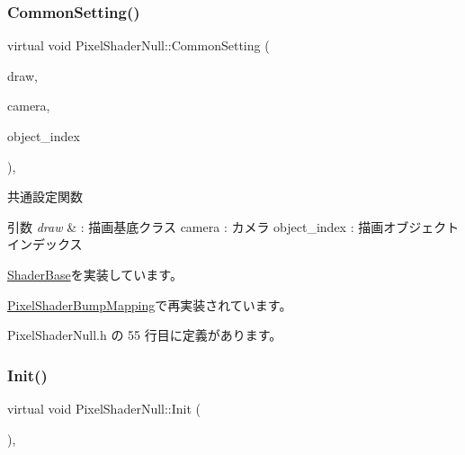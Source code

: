 \subsubsection{\texorpdfstring{Common\+Setting()}{CommonSetting()}}
{\footnotesize\ttfamily virtual void Pixel\+Shader\+Null\+::\+Common\+Setting (\begin{DoxyParamCaption}\item[{\mbox{\hyperlink{class_draw_base}{Draw\+Base}} $\ast$}]{draw,  }\item[{\mbox{\hyperlink{class_camera}{Camera}} $\ast$}]{camera,  }\item[{unsigned}]{object\+\_\+index }\end{DoxyParamCaption})\hspace{0.3cm}{\ttfamily [inline]}, {\ttfamily [virtual]}}



共通設定関数 


\begin{DoxyParams}{引数}
{\em draw} & \+: 描画基底クラス camera \+: カメラ object\+\_\+index \+: 描画オブジェクトインデックス \\
\hline
\end{DoxyParams}


\mbox{\hyperlink{class_shader_base_aef6fa922223d71fbec81464ebbfaf687}{Shader\+Base}}を実装しています。



\mbox{\hyperlink{class_pixel_shader_bump_mapping_af62a2b40930533a3bae17319f876705d}{Pixel\+Shader\+Bump\+Mapping}}で再実装されています。



 Pixel\+Shader\+Null.\+h の 55 行目に定義があります。

\mbox{\label{class_pixel_shader_null_abfd7a6a986da09061a55d31024219eba}} 
\subsubsection{\texorpdfstring{Init()}{Init()}}
{\footnotesize\ttfamily virtual void Pixel\+Shader\+Null\+::\+Init (\begin{DoxyParamCaption}{ }\end{DoxyParamCaption})\hspace{0.3cm}{\ttfamily [inline]}, {\ttfamily [virtual]}}




